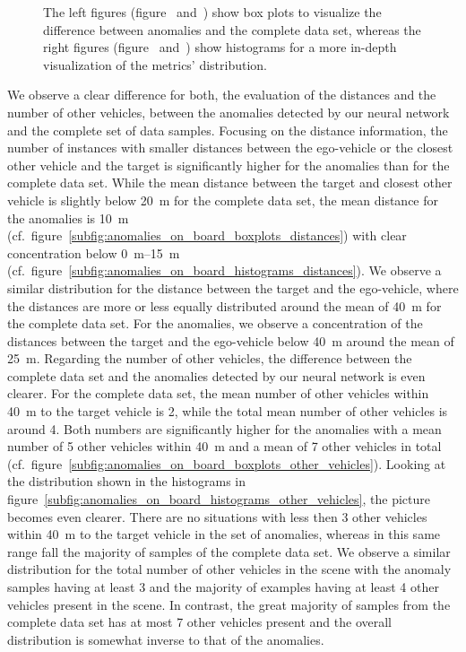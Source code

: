 \begin{figure}[t]
{    The left figures (figure~\protect{} and~\protect{}) show box plots to visualize the difference between anomalies and the complete data set, whereas the right figures (figure~\protect{} and~\protect{}) show histograms for a more in-depth visualization of the metrics' distribution.}
    \label{fig:anomaly_ngsim}
\end{figure}

We observe a clear difference for both, the evaluation of the distances and the number of other vehicles, between the anomalies detected by our neural network and the complete set of data samples.
Focusing on the distance information, the number of instances with smaller distances between the ego-vehicle or the closest other vehicle and the target is significantly higher for the anomalies than for the complete data set.
While the mean distance between the target and closest other vehicle is slightly below \SI{20}{\meter} for the complete data set, the mean distance for the anomalies is \SI{10}{\meter} (cf.\ figure~\ref{subfig:anomalies_on_board_boxplots_distances}) with clear concentration below \SIrange{0}{15}{\meter} (cf.\ figure~\ref{subfig:anomalies_on_board_histograms_distances}).
We observe a similar distribution for the distance between the target and the ego-vehicle, where the distances are more or less equally distributed around the mean of \SI{40}{\meter} for the complete data set.
For the anomalies, we observe a concentration of the distances between the target and the ego-vehicle below \SI{40}{\meter} around the mean of \SI{25}{\meter}.
Regarding the number of other vehicles, the difference between the complete data set and the anomalies detected by our neural network is even clearer.
For the complete data set, the mean number of other vehicles within \SI{40}{\meter} to the target vehicle is \num{2}, while the total mean number of other vehicles is around \num{4}.
Both numbers are significantly higher for the anomalies with a mean number of \num{5} other vehicles within \SI{40}{\meter} and a mean of \num{7} other vehicles in total (cf.\ figure~\ref{subfig:anomalies_on_board_boxplots_other_vehicles}).
Looking at the distribution shown in the histograms in figure~\ref{subfig:anomalies_on_board_histograms_other_vehicles}, the picture becomes even clearer. 
There are no situations with less then \num{3} other vehicles within \SI{40}{\meter} to the target vehicle in the set of anomalies, whereas in this same range fall the majority of samples of the complete data set.
We observe a similar distribution for the total number of other vehicles in the scene with the anomaly samples having at least \num{3} and the majority of examples having at least \num{4} other vehicles present in the scene.
In contrast, the great majority of samples from the complete data set has at most \num{7} other vehicles present and the overall distribution is somewhat inverse to that of the anomalies.


